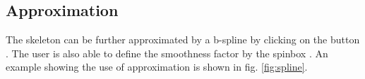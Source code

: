 \subsection{Approximation}
The skeleton can be further approximated by a b-spline by clicking on the button . The user is also able to define the smoothness factor by the spinbox . An example showing the use of approximation is shown in fig. \ref{fig:spline}.

\begin{figure}[htb]
	\centering
	\hskip 0.1cm
	\\

\end{figure}
